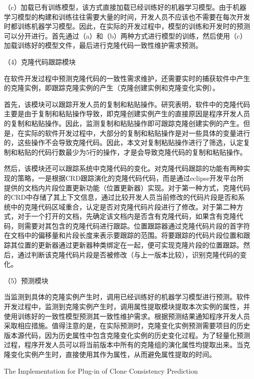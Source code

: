 （c）加载已有训练模型，该方式直接加载已经训练好的机器学习模型。由于机器学习模型的构建和训练往往需要大量的时间，开发人员不应该也不需要在每次开发时都训练机器学习模型。因此，在实际的开发过程中，模型的训练和开发时的预测可以分开进行。首先通过（a）和（b）两种方式进行模型的训练，然后使用（c）加载训练好的模型文件，最后进行克隆代码一致性维护需求预测。

（4）克隆代码跟踪模块

在软件开发过程中预测克隆代码的一致性需求维护，还需要实时的捕获软件中产生的克隆实例，即跟踪克隆实例的产生（克隆创建实例和克隆变化实例）。

首先，该模块可以跟踪开发人员的复制和粘贴操作。研究表明，软件中的克隆代码主要是由于复制和粘贴操作导致，即克隆创建实例产生的直接原因是程序开发人员的复制和粘贴操作。因此，监测复制和粘贴操作即可跟踪克隆创建实例的产生。但是，在实际的软件开发过程中，大部分的复制和粘贴操作是对一些具体的变量进行的，这些操作不会导致克隆代码。因此，本文对复制粘贴操作进行了筛选，认定复制和粘贴的代码行数最少为5行的操作，才是会导致克隆代码的复制和粘贴操作。

然后，该模块还可以跟踪系统中克隆代码的变化。对克隆代码跟踪的功能有两种实现的策略，一是根据CRD跟踪演化的克隆代码代码，而是通过eclipse开发平台所提供的文档内片段位置更新功能（位置更新器）实现。对于第一种方式，克隆代码的CRD中存储了其上下文信息，通过比较开发人员当前修改的代码片段是否和系统中的克隆代码区域重合，认定是否对克隆代码片段进行了修改。对于第二种方式，对于一个打开的文档，先确定该文档内是否含有克隆代码，如果含有克隆代码，则需要对其包含的克隆代码进行跟踪。位置跟踪器通过克隆代码片段的首字符在文档中的偏移量和片段长度来表示要跟踪的范围。将要跟踪的代码片段位置和跟踪其位置的更新器通过更新器种类绑定在一起，便可实现克隆片段的位置跟踪。然后，通过判断该克隆代码片段是否被修改（与上一版本比较），识别克隆代码的变化。

（5）预测模块

当监测到具体的克隆实例产生时，调用已经训练好的机器学习模型进行预测。软件开发过程中，监测到克隆实例产生时，调用属性提取模块提取本次实例的属性，并使用训练好的一致性模型预测其一致性维护需求。根据预测结果通知程序开发人员采取相应措施。值得注意的是，在实际预测时，克隆变化实例预测需要项目的历史版本源代码，因为历史属性中包含克隆变化实例的历史变化过程。为了轻量化预测过程，程序开发人员可以将当前版本中所有的克隆组的演化属性均提取出来。当克隆变化实例产生时，直接使用其作为属性，从而避免属性提取的时间。

{The Implementation for Plug-in of Clone Consistency Prediction}

